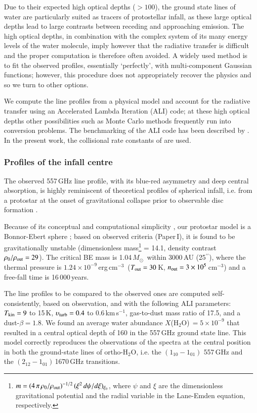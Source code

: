 \documentclass{aa}
\newcommand{\cmthree}{cm$^{-3}$}
\newcommand{\kms}{km\,s$^{-1}$}       %
\newcommand{\water}{H$_{2}$O}
\newcommand{\msun}{$M_{\odot}$}
\newcommand{\asec}{$^{\prime \prime}$}
\begin{document}
Due to their expected high optical depths ($>100$), the ground state lines of water are particularly suited as tracers of protostellar infall, as these large optical depths lead to large contrasts between receding and approaching emission. The high optical depths, in combination with the complex system of its many energy levels of the water molecule, imply however that the radiative transfer is difficult and the proper computation is therefore often avoided. A widely used method is to fit the observed profiles, essentially `perfectly', with multi-component Gaussian functions; however, this procedure does not  appropriately recover the physics and so we turn  to other options.

We compute the line profiles from a physical model and account for the radiative transfer using an Accelerated Lambda Iteration (ALI) code; at these high optical depths other possibilities such as Monte Carlo methods frequently 
run into conversion problems. The benchmarking of the ALI code has been described by \citet{maercker2008}. In the present work, the collisional rate constants of \cite{faure2007} are used.

\subsubsection{Profiles of the infall centre}

The observed 557\,GHz line profile, with its blue-red asymmetry and deep central absorption, is highly reminiscent of theoretical profiles of spherical infall, i.e.  from a protostar at the onset of gravitational collapse prior to observable disc formation \citep[e.g.][]{ashby2000}.

Because of its conceptual and computational simplicity \citep[see e.g.][]{foster1993}, our protostar model is a Bonnor-Ebert sphere \citep[BE,][]{bonnor1957,ebert1957};  based on observed criteria (Paper\,I), it is found to be gravitationally unstable (dimensionless mass\footnote{$m=(4\,\pi\,\rho_{\rm 0}/\rho_{\rm out})^{-1/2}\,(\xi^2\,d\psi/d\xi)_{\xi_0}$, where $\psi$ and $\xi$ are the dimensionless gravitational potential and the radial variable in the Lane-Emden equation, respectively.} = 14.1, density contrast $\rho_{\rm 0}/\rho_{\rm out}= 29$).  The critical BE mass is 1.04\,\msun\ within 3000\,AU (25\asec), where the thermal pressure is $1.24 \times 10^{-9}$\,erg\,\cmthree\ ($T_{\rm out}=30$\,K, $n_{\rm out}=3 \times 10^5$\,\cmthree)  and a free-fall time is 16\,000\,years. 

The line profiles to be compared to the observed ones are computed self-consistently, based on observation, and with the following ALI  parameters: $T_{\rm kin}=9$ to 15\,K, $\upsilon_{\rm turb}=0.4$ to 0.6\,\kms,  gas-to-dust mass ratio of 17.5, and a dust-$\beta=1.8$.  We found an average water abundance $X$(\water)\,$= 5 \times 10^{-9}$ that resulted in a central optical depth of 160 in the 557\,GHz ground state line. This model correctly reproduces the observations of the spectra at the central position in both the ground-state lines of ortho-\water, i.e. the $(1_{10}-1_{01})$ 557\,GHz and the $(2_{12}-1_{01})$\,1670\,GHz transitions.
\end{document}
